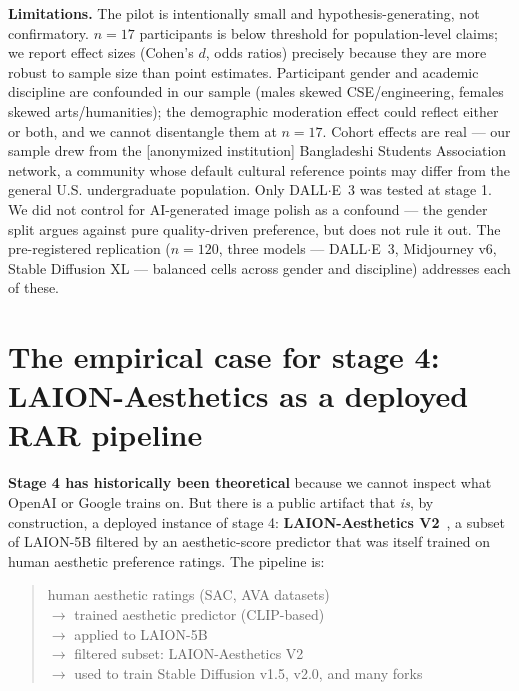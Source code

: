 \documentclass[sigconf,nonacm]{acmart}
\begin{document}
\textbf{Limitations.} The pilot is intentionally small and hypothesis-generating, not confirmatory. \(n=17\) participants is below threshold for population-level claims; we report effect sizes (Cohen's \(d\), odds ratios) precisely because they are more robust to sample size than point estimates. Participant gender and academic discipline are confounded in our sample (males skewed CSE/engineering, females skewed arts/humanities); the demographic moderation effect could reflect either or both, and we cannot disentangle them at \(n=17\). Cohort effects are real --- our sample drew from the [anonymized institution] Bangladeshi Students Association network, a community whose default cultural reference points may differ from the general U.S. undergraduate population. Only DALL$\cdot$E~3 was tested at stage 1. We did not control for AI-generated image polish as a confound --- the gender split argues against pure quality-driven preference, but does not rule it out. The pre-registered replication (\(n=120\), three models --- DALL$\cdot$E~3, Midjourney v6, Stable Diffusion XL --- balanced cells across gender and discipline) addresses each of these.

\section{The empirical case for stage 4: LAION-Aesthetics as a deployed RAR pipeline}
\label{sec:stage4}

\textbf{Stage 4 has historically been theoretical} because we cannot inspect what OpenAI or Google trains on. But there is a public artifact that \emph{is}, by construction, a deployed instance of stage 4: \textbf{LAION-Aesthetics V2}~\cite{schuhmann2022laion}, a subset of LAION-5B filtered by an aesthetic-score predictor that was itself trained on human aesthetic preference ratings. The pipeline is:

\begin{quote}\small
human aesthetic ratings (SAC, AVA datasets)\\
\(\rightarrow\) trained aesthetic predictor (CLIP-based)\\
\(\rightarrow\) applied to LAION-5B\\
\(\rightarrow\) filtered subset: LAION-Aesthetics V2\\
\(\rightarrow\) used to train Stable Diffusion v1.5, v2.0, and many forks
\end{quote}
\end{document}
